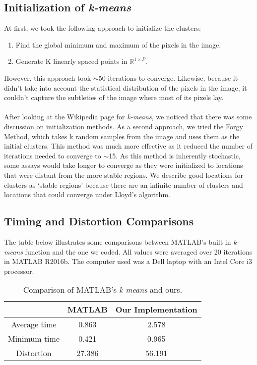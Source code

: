 \documentclass[]{../ncmathy}
\begin{document}
	\subsection{Initialization of \textit{k-means}}
		At first, we took the following approach to initialize the clusters:
			\begin{enumerate}
			\item Find the global minimum and maximum of the pixels in the image.
			\item Generate K linearly spaced points in $\mathbb{R}^{1\times P}$.
			\end{enumerate}
		However, this approach took $\sim$50 iterations to converge. Likewise, because it didn't take into account the statistical distribution of the pixels in the image, it couldn't capture the subtleties of the image where most of its pixels lay. 
		\\\\
		After looking at the Wikipedia page for \textit{k-means}, we noticed that there was some discussion on initialization methods. As a second approach, we tried the Forgy Method, which takes k random samples from the image and uses them as the initial clusters. This method was much more effective as it reduced the number of iterations needed to converge to $\sim$15. As this method is inherently stochastic, some assays would take longer to converge as they were initialized to locations that were distant from the more stable regions. We describe good locations for clusters as `stable regions' because there are an infinite number of clusters and locations that could converge under Lloyd's algorithm. 
	
	\subsection{Timing and Distortion Comparisons}
			The table below illustrates some comparisons between MATLAB's built in \textit{k-means} function and the one we coded. All values were averaged over 20 iterations in MATLAB R2016b. The computer used was a Dell laptop with an Intel Core i3 processor. 
			
			\begin{table}[H]
			\centering\makegapedcells
			\begin{tabular}{||c c c||}
			\hline
			 & MATLAB & Our Implementation \\
			\hline\hline
			Average time & 0.863 & 2.578 \\
			Minimum time & 0.421 & 0.965 \\
			Distortion & 27.386 & 56.191 \\
			\hline
			\end{tabular}
			\caption{Comparison of MATLAB's \textit{k-means} and ours.}\end{table}
			
\end{document}
